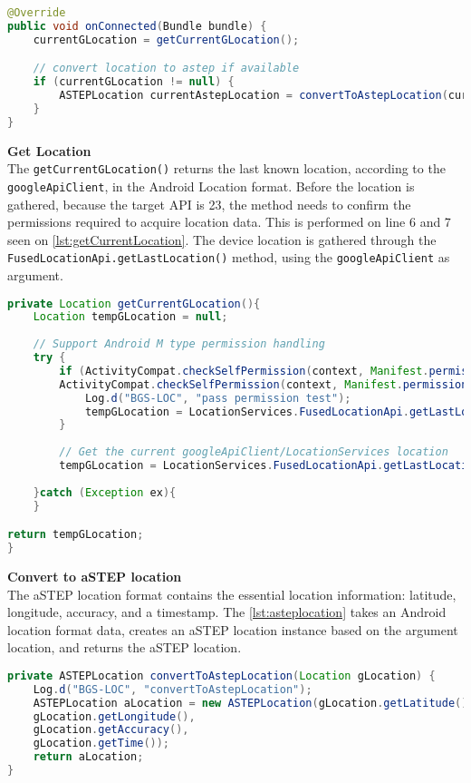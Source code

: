 \begin{lstlisting}[caption={onConnected()},label={lst:onconnected},language=Java]
@Override
public void onConnected(Bundle bundle) {
	currentGLocation = getCurrentGLocation();

	// convert location to astep if available
	if (currentGLocation != null) {
		ASTEPLocation currentAstepLocation = convertToAstepLocation(currentGLocation);
	}
}
\end{lstlisting}


\textbf{Get Location}\\
The \texttt{getCurrentGLocation()} returns the last known location, according to the \texttt{googleApiClient}, in the Android Location format.
Before the location is gathered, because the target API is 23, the method needs to confirm the permissions required to acquire location data.
This is performed on line 6 and 7 seen on \ref{lst:getCurrentLocation}.
The device location is gathered through the \texttt{FusedLocationApi.getLastLocation()} method, using the \texttt{googleApiClient} as argument.

\begin{lstlisting}[caption={getCurrentLocation()},label={lst:getCurrentLocation},language=Java]
private Location getCurrentGLocation(){
	Location tempGLocation = null;
	
	// Support Android M type permission handling
	try {
		if (ActivityCompat.checkSelfPermission(context, Manifest.permission.ACCESS_FINE_LOCATION) != PackageManager.PERMISSION_GRANTED &&
		ActivityCompat.checkSelfPermission(context, Manifest.permission.ACCESS_COARSE_LOCATION) != PackageManager.PERMISSION_GRANTED) {
			Log.d("BGS-LOC", "pass permission test");
			tempGLocation = LocationServices.FusedLocationApi.getLastLocation(googleApiClient);
		}
		
		// Get the current googleApiClient/LocationServices location
		tempGLocation = LocationServices.FusedLocationApi.getLastLocation(googleApiClient);
		
	}catch (Exception ex){
	}

return tempGLocation;
}
\end{lstlisting}

\textbf{Convert to aSTEP location}\\
The aSTEP location format contains the essential location information: latitude, longitude, accuracy, and a timestamp.
The \ref{lst:asteplocation} takes an Android location format data, creates an aSTEP location instance based on the argument location, and returns the aSTEP location.

\begin{lstlisting}[caption={ASTEPLocation()},label={lst:asteplocation},language=Java]
private ASTEPLocation convertToAstepLocation(Location gLocation) {
	Log.d("BGS-LOC", "convertToAstepLocation");
	ASTEPLocation aLocation = new ASTEPLocation(gLocation.getLatitude(),
	gLocation.getLongitude(),
	gLocation.getAccuracy(),
	gLocation.getTime());
	return aLocation;
}
\end{lstlisting}


